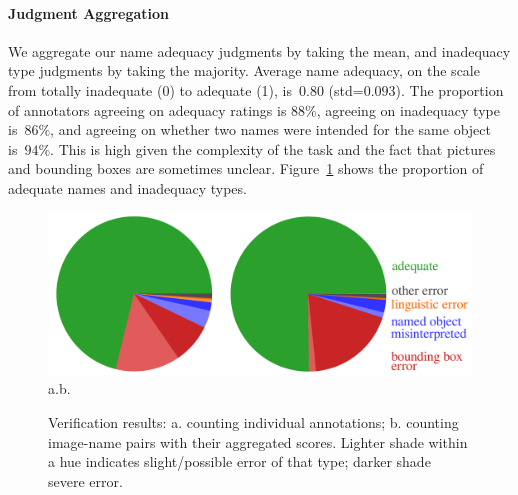 
\paragraph{Judgment Aggregation}
We aggregate our name adequacy judgments by taking the mean, and inadequacy type judgments by taking the majority.
Average name adequacy, on the scale from totally inadequate (0) to adequate (1), is~$0.80$ (\mbox{std=$0.093$}).
The proportion of annotators agreeing on adequacy ratings is 88\%, agreeing on inadequacy type is~$86\%$, and agreeing on whether two names were intended for the same object is~$94\%$.
This is high given the complexity of the task
and the fact that pictures and bounding boxes are sometimes unclear.
Figure~\ref{fig:verification-piechart} shows the proportion of adequate names and inadequacy types.
\begin{figure}[t]
	\centering
	\includegraphics[width=\columnwidth]{images/verification_piechart_double.pdf}\\
	\hspace*{\fill}a.\hspace*{\fill}\hspace*{\fill}b.\hspace*{\fill}\hspace*{\fill}
	\caption{Verification results: a. counting individual annotations; b. counting image-name pairs with their aggregated scores. Lighter shade within a hue indicates slight/possible error of that type; darker shade severe error.}
	\label{fig:verification-piechart}
\end{figure}

